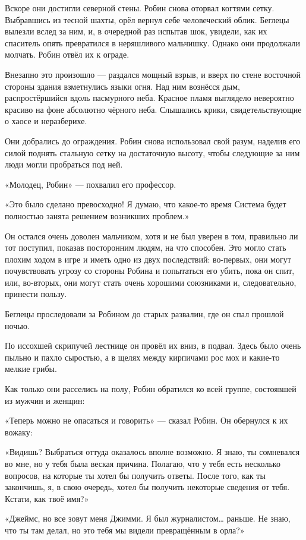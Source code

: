\documentclass[a5paper, 9pt,
final, openany, twoside=true]{memoir}
\begin{document}
Вскоре они достигли северной стены. Робин снова оторвал когтями сетку. Выбравшись из тесной шахты, орёл вернул себе человеческий облик. Беглецы вылезли вслед за ним, и, в очередной раз испытав шок, увидели, как их спаситель опять превратился в неряшливого мальчишку. Однако они продолжали молчать. Робин отвёл их к ограде.

Внезапно это произошло — раздался мощный взрыв, и вверх по стене восточной стороны здания взметнулись языки огня. Над ним вознёсся дым, распростёршийся вдоль пасмурного неба. Красное пламя выглядело невероятно красиво на фоне абсолютно чёрного неба. Слышались крики, свидетельствующие о хаосе и неразберихе.

Они добрались до ограждения. Робин снова использовал свой разум, наделив его силой поднять стальную сетку на достаточную высоту, чтобы следующие за ним люди могли пробраться под ней.

«Молодец, Робин» — похвалил его профессор.

«Это было сделано превосходно! Я думаю, что какое-то время Система будет полностью занята решением возникших проблем.»

Он остался очень доволен мальчиком, хотя и не был уверен в том, правильно ли тот поступил, показав посторонним людям, на что способен. Это могло стать плохим ходом в игре и иметь одно из двух последствий: во-первых, они могут почувствовать угрозу со стороны Робина и попытаться его убить, пока он спит, или, во-вторых, они могут стать очень хорошими союзниками и, следовательно, принести пользу.

Беглецы проследовали за Робином до старых развалин, где он спал прошлой ночью.

По иссохшей скрипучей лестнице он провёл их вниз, в подвал. Здесь было очень пыльно и пахло сыростью, а в щелях между кирпичами рос мох и какие-то мелкие грибы.

Как только они расселись на полу, Робин обратился ко всей группе, состоявшей из мужчин и женщин:

«Теперь можно не опасаться и говорить» — сказал Робин. Он обернулся к их вожаку:

«Видишь? Выбраться оттуда оказалось вполне возможно. Я знаю, ты сомневался во мне, но у тебя была веская причина. Полагаю, что у тебя есть несколько вопросов, на которые ты хотел бы получить ответы. После того, как ты закончишь, я, в свою очередь, хотел бы получить некоторые сведения от тебя. Кстати, как твоё имя?»

«Джеймс, но все зовут меня Джимми. Я был журналистом… раньше. Не знаю, что ты там делал, но это тебя мы видели превращённым в орла?»
\end{document}
